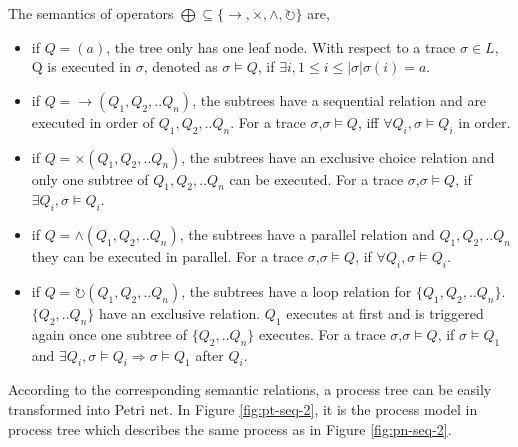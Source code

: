 \begin{definition} 
	The semantics of operators $\bigoplus \subseteq \{\rightarrow, \times, \land, \circlearrowright \}$ are,
	\begin{itemize}
		\item if $Q=(a)$, the tree only has one leaf node. With respect to a trace $\sigma \in L$, Q is executed in $\sigma$, denoted as $\sigma \models Q$, if $\exists i, 1 \leq i \leq |\sigma| \sigma(i)=a$.
		\item if $Q= \rightarrow(Q_1 , Q_2 ,.. Q_n)$, the subtrees have a sequential relation and are executed in order of $Q_1,Q_2,..Q_n$. For a trace $\sigma$,$\sigma \models Q$, iff $\forall Q_i, \sigma \models Q_i$ in order.
		\item if $Q= \times(Q_1 , Q_2 ,.. Q_n)$,  the subtrees have an exclusive choice relation and only one subtree of $Q_1,Q_2,..Q_n$  can be executed. 
		For a trace $\sigma$,$\sigma \models Q$, if $\exists Q_i, \sigma \models Q_i$.
		\item if $Q= \land (Q_1 , Q_2 ,.. Q_n)$,  the subtrees have a parallel relation and $Q_1,Q_2,..Q_n$ they can be executed in parallel. For a trace $\sigma$,$\sigma \models Q$, if $\forall Q_i, \sigma \models Q_i$.
		\item if $Q= \circlearrowright(Q_1 , Q_2 ,.. Q_n)$,  the subtrees have a loop relation for $\{Q_1,Q_2,..Q_n\}$. $\{Q_2,..Q_n\}$ have an exclusive relation. $Q_1$ executes at first and is triggered again once one subtree of $\{Q_2,..Q_n\}$ executes. For a trace $\sigma$,$\sigma \models Q$, if $ \sigma \models Q_1$ and $\exists Q_i, \sigma \models Q_i \Rightarrow  \sigma \models Q_1$ after $Q_i$.
	\end{itemize}
\end{definition}
According to the corresponding semantic relations,  a process tree can be easily transformed into Petri net. In Figure \ref{fig:pt-seq-2}, it is the process model in process tree which describes the same process as in Figure \ref{fig:pn-seq-2}. 

